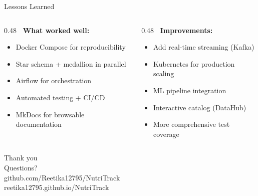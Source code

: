 \documentclass[aspectratio=169, 10pt]{beamer}
\begin{document}
\begin{frame}{Lessons Learned}
\begin{columns}[T]
\begin{column}{0.48\textwidth}
  \textbf{\color{ntgreen}\faThumbsUp\ What worked well:}
  \begin{itemize}\small
    \item Docker Compose for reproducibility
    \item Star schema + medallion in parallel
    \item Airflow for orchestration
    \item Automated testing + CI/CD
    \item MkDocs for browsable documentation
  \end{itemize}
\end{column}
\begin{column}{0.48\textwidth}
  \textbf{\color{ntaccent}\faLightbulb\ Improvements:}
  \begin{itemize}\small
    \item Add real-time streaming (Kafka)
    \item Kubernetes for production scaling
    \item ML pipeline integration
    \item Interactive catalog (DataHub)
    \item More comprehensive test coverage
  \end{itemize}
\end{column}
\end{columns}

\end{frame}

\begin{frame}[standout]
  \vspace{1cm}

  {\Huge Thank you}\\[0.5cm]
  {\large Questions?}\\[1cm]

  {\normalsize\faGithub\quad github.com/Reetika12795/NutriTrack}\\[0.2cm]
  {\normalsize\faGlobe\quad reetika12795.github.io/NutriTrack}
\end{frame}
\end{document}

